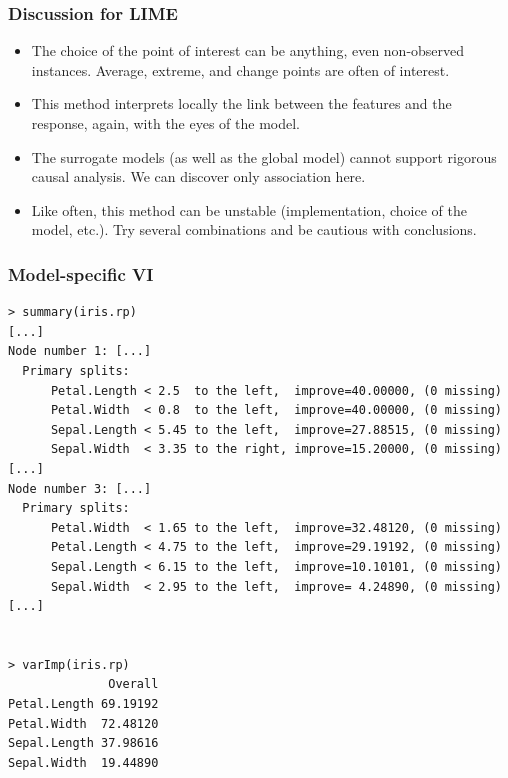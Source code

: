 \begin{frame}
\frametitle{Discussion for LIME}
\begin{itemize}
\item The choice of the point of interest can be anything, even non-observed instances. Average, extreme, and change points are often of interest.
\item This method interprets locally the link between the features and the response, again, with the eyes of the model.
\item The surrogate models (as well as the global model) cannot support rigorous causal analysis. We can discover only association here.
\item Like often, this method can be unstable (implementation, choice of the model, etc.). Try several combinations and be cautious with conclusions.
\end{itemize}
\end{frame}


\begin{frame}[fragile]
\frametitle{Model-specific VI}
\tiny
\begin{verbatim}
> summary(iris.rp)
[...]
Node number 1: [...]
  Primary splits:
      Petal.Length < 2.5  to the left,  improve=40.00000, (0 missing)
      Petal.Width  < 0.8  to the left,  improve=40.00000, (0 missing)
      Sepal.Length < 5.45 to the left,  improve=27.88515, (0 missing)
      Sepal.Width  < 3.35 to the right, improve=15.20000, (0 missing)
[...]
Node number 3: [...]
  Primary splits:
      Petal.Width  < 1.65 to the left,  improve=32.48120, (0 missing)
      Petal.Length < 4.75 to the left,  improve=29.19192, (0 missing)
      Sepal.Length < 6.15 to the left,  improve=10.10101, (0 missing)
      Sepal.Width  < 2.95 to the left,  improve= 4.24890, (0 missing)
[...]


> varImp(iris.rp)
              Overall
Petal.Length 69.19192
Petal.Width  72.48120
Sepal.Length 37.98616
Sepal.Width  19.44890
\end{verbatim}
\end{frame}
